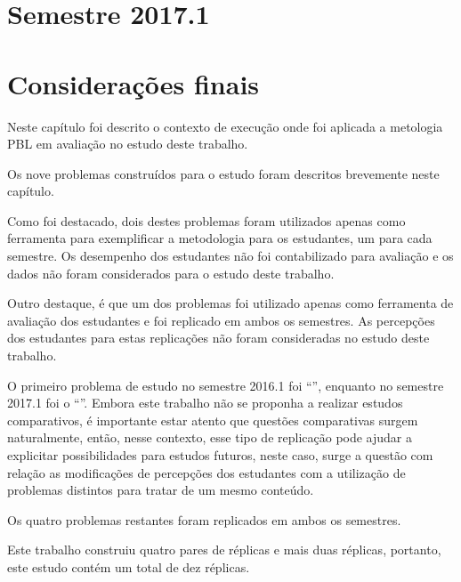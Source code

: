 \section{Semestre 2017.1}
\label{sec-exp-2017}

\section{Considerações finais}
\label{sec-consideracoes-experiencias}
Neste capítulo foi descrito o contexto de execução onde foi aplicada a
metologia PBL em avaliação no estudo deste trabalho.

Os nove problemas construídos para o estudo foram descritos brevemente neste capítulo.

Como foi destacado, dois destes problemas foram utilizados
apenas como ferramenta para exemplificar a metodologia para os estudantes,
um para cada semestre.
Os desempenho dos estudantes não foi contabilizado para avaliação
e os dados não foram considerados para o estudo deste trabalho.

Outro destaque, é que um dos problemas foi utilizado apenas como ferramenta
de avaliação dos estudantes e foi replicado em ambos os semestres.
As percepções dos estudantes para estas replicações não foram
consideradas no estudo deste trabalho.

O primeiro problema de estudo no semestre 2016.1 foi ``\ProblemaA'', enquanto no
semestre 2017.1 foi o ``\ProblemaG''.
Embora este trabalho não se proponha a realizar estudos comparativos, é importante
estar atento que questões comparativas surgem naturalmente, então, nesse contexto,
esse tipo de replicação pode ajudar a explicitar possibilidades para
estudos futuros, neste caso, surge a questão com relação as modificações de
percepções dos estudantes com a utilização de problemas distintos
para tratar de um mesmo conteúdo.

Os quatro problemas restantes foram replicados em ambos os semestres.

Este trabalho construiu quatro pares de réplicas e mais duas
réplicas, portanto, este estudo contém um total de dez
réplicas.
